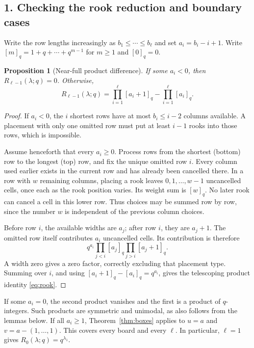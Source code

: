 \documentclass[11pt]{article}
\newtheorem{proposition}{Proposition}
\newcommand{\qint}[1]{[#1]_q}
\begin{document}
\subsection*{1. Checking the rook reduction and boundary cases}
Write the row lengths increasingly as $b_1\le\cdots\le b_\ell$ and set
$a_i=b_i-i+1$. Write $\qint m=1+q+\cdots+q^{m-1}$ for $m\ge1$ and
$\qint0=0$.

\begin{proposition}[Near-full product difference]\label{prop:rook}
If some $a_i<0$, then $R_{\ell-1}(\lambda;q)=0$. Otherwise,
\begin{equation}\label{eq:rook}
 R_{\ell-1}(\lambda;q)=\prod_{i=1}^{\ell}\qint{a_i+1}
                         -\prod_{i=1}^{\ell}\qint{a_i}.
\end{equation}
\end{proposition}
\begin{proof}
If $a_i<0$, the $i$ shortest rows have at most $b_i\le i-2$ columns
available. A placement with only one omitted row must put at least $i-1$
rooks into those rows, which is impossible.

Assume henceforth that every $a_i\ge0$. Process rows from the shortest
(bottom) row to the longest (top) row, and fix the unique omitted row $i$.
Every column used earlier exists in the current row and has already been
cancelled there. In a row with $w$ remaining columns, placing a rook leaves
$0,1,\ldots,w-1$ uncancelled cells, once each as the rook position varies.
Its weight sum is $\qint w$. No later rook can cancel a cell in this lower
row. Thus choices may be summed row by row, since the number $w$ is
independent of the previous column choices.

Before row $i$, the available widths are $a_j$; after row $i$, they are
$a_j+1$. The omitted row itself contributes $a_i$ uncancelled cells. Its
contribution is therefore
\[
 q^{a_i}\prod_{j<i}\qint{a_j}\prod_{j>i}\qint{a_j+1}.
\]
A width zero gives a zero factor, correctly excluding that placement type.
Summing over $i$, and using $\qint{a_i+1}-\qint{a_i}=q^{a_i}$, gives the
telescoping product identity \eqref{eq:rook}.
\end{proof}
If some $a_i=0$, the second product vanishes and the first is a product of
$q$-integers. Such products are symmetric and unimodal, as also follows
from the lemmas below. If all $a_i\ge1$, Theorem~\ref{thm:boxes} applies
to $u=a$ and $v=a-(1,\ldots,1)$. This covers every board and every $\ell$.
In particular, $\ell=1$ gives $R_0(\lambda;q)=q^{\lambda_1}$.
\end{document}
